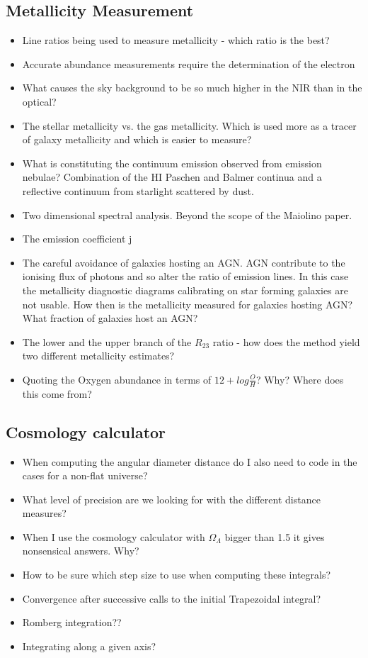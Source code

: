 \documentclass{literature}
\begin{document}
\subsection{Metallicity Measurement}\label{que:metallicity}
\begin{itemize}
\item Line ratios being used to measure metallicity - which ratio is the best? 
\item Accurate abundance measurements require the determination of the electron 
\item What causes the sky background to be so much higher in the NIR than in the optical?
\item The stellar metallicity vs. the gas metallicity. Which is used more as a tracer of galaxy metallicity and which is easier to measure? 
\item What is constituting the continuum emission observed from emission nebulae? Combination of the HI Paschen and Balmer continua and a reflective continuum from starlight scattered by dust.
\item Two dimensional spectral analysis. Beyond the scope of the Maiolino paper.
\item The emission coefficient j
\item The careful avoidance of galaxies hosting an AGN. AGN contribute to the ionising flux of photons and so alter the ratio of emission lines. In this case the metallicity diagnostic diagrams calibrating on star forming galaxies are not usable. How then is the metallicity measured for galaxies hosting AGN? What fraction of galaxies host an AGN? 
\item The lower and the upper branch of the $R_{23}$ ratio - how does the method yield two different metallicity estimates?
\item Quoting the Oxygen abundance in terms of $12 + log\frac{O}{H}$? Why? Where does this come from? 
\end{itemize}

\subsection{Cosmology calculator}\label{que:cosmology_calc}
\begin{itemize}
	\item When computing the angular diameter distance do I also need to code in the cases for a non-flat universe?
	\item What level of precision are we looking for with the different distance measures?
	\item When I use the cosmology calculator with $\Omega _{\Lambda}$ bigger than 1.5 it gives nonsensical answers. Why? 
	\item How to be sure which step size to use when computing these integrals?
	\item Convergence after successive calls to the initial Trapezoidal integral? 
	\item Romberg integration??
	\item Integrating along a given axis?
\end{itemize}
\end{document}
